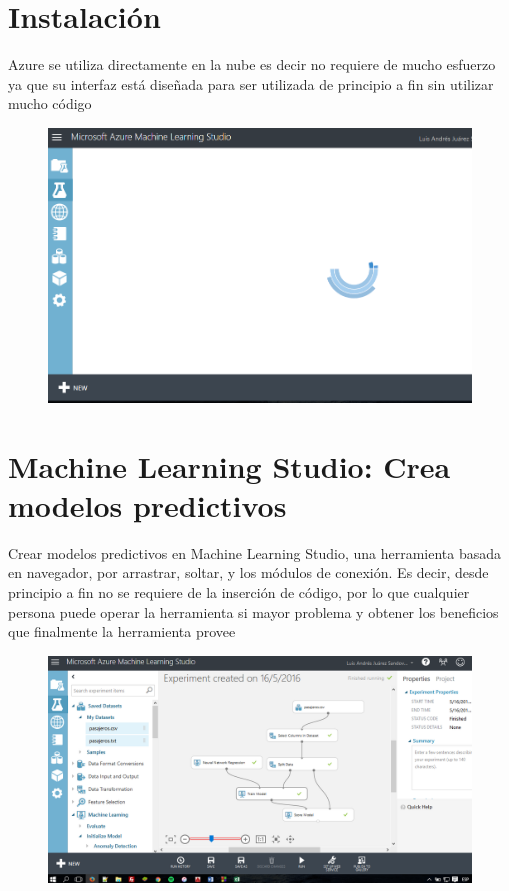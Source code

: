 \documentclass[11pt]{article}
\begin{document}
\newpage
\section{Instalación}


Azure se utiliza directamente en la nube es decir no requiere de mucho esfuerzo ya que su interfaz está diseñada para ser utilizada de principio a fin sin utilizar mucho código 

\begin{figure}[htp]
\centering
\includegraphics[width=12cm]{e.jpg}
\label{fig:lion}
\end{figure}


\section{Machine Learning Studio: Crea modelos predictivos}

Crear modelos predictivos en Machine Learning Studio, una herramienta basada en navegador, por arrastrar, soltar, y los módulos de conexión. Es decir, desde principio a fin no se requiere de la inserción de código, por lo que cualquier persona puede operar la herramienta si mayor problema y obtener los beneficios que finalmente la herramienta provee 



\begin{figure}[htp]
\centering
\includegraphics[width=13cm]{6.jpg}
\label{fig:lion}
\end{figure}
\end{document}
